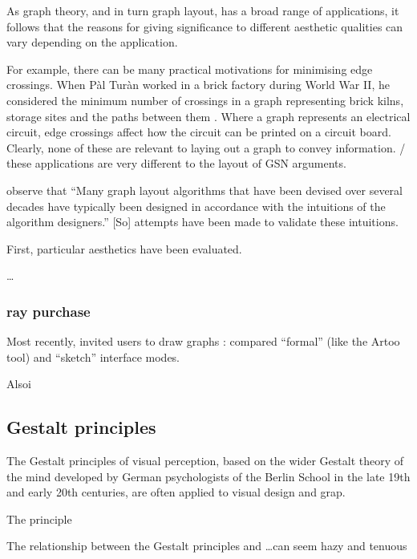 As graph theory, and in turn graph layout, has a broad range of applications, it follows that the reasons for giving significance to different aesthetic qualities can vary depending on the application.

For example, there can be many practical motivations for minimising edge crossings.
When P\`{a}l Tur\`{a}n worked in a brick factory during World War II,
he considered the minimum number of crossings in a graph representing
brick kilns, storage sites and the paths between them .
Where a graph represents an electrical circuit, edge crossings affect how the circuit can be printed on a circuit board.
Clearly, none of these are relevant to laying out a graph to convey information. / these applications are very different to the layout of GSN arguments.

\citet{5674033} observe that ``Many graph layout algorithms that have been devised over
several decades have typically been designed in accordance with the intuitions of the algorithm designers.'' [So] attempts have been made to validate these intuitions.

First, particular aesthetics have been evaluated.

\ldots

\subsubsection{ray purchase}

Most recently, \citet{5674033} invited users to draw graphs :
compared ``formal'' (like the Artoo tool) and ``sketch'' interface modes.

Alsoi 



\subsection{Gestalt principles}

The Gestalt principles of visual perception,
based on the wider Gestalt theory of the mind developed by German psychologists of the Berlin School in the late 19th and early 20th centuries,
are often applied to visual design and grap.

The principle 

The relationship between the Gestalt principles and \ldots can seem hazy and tenuous





